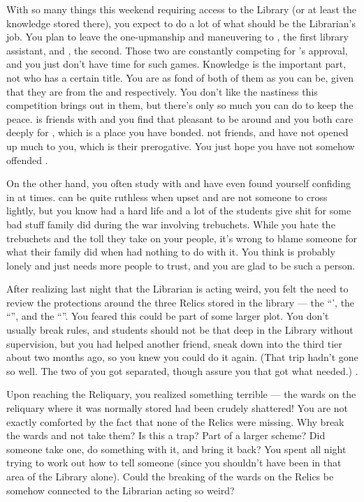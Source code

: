 \documentclass[char]{GL2020}
\begin{document}
With so many things this weekend requiring access to the Library (or at least the knowledge stored there), you expect to do a lot of what should be the Librarian’s job. You plan to leave the one-upmanship and maneuvering to \cAmbition{\full}, the first library assistant, and \cLibAssist{\full}, the second. Those two are constantly competing for \cLibrarian{}’s approval, and you just don’t have time for such games. Knowledge is the important part, not who has a certain title. You are as fond of both of them as you can be, given that they are from the \pTech{} and \pFarm{} respectively. You don't like the nastiness this competition brings out in them, but there's only so much you can do to keep the peace. \cAmbition{} is friends with \cHeir{} and you find that \cAmbition{\theyare} pleasant to be around and you both care deeply for \cHeir{}, which is a place you have bonded. \cAmbition{\Theyare} not friends, and have not opened up much to you, which is their prerogative. You just hope you have not somehow offended \cAmbition{\them}.

On the other hand, you often study with \cLibAssist{} and have even found yourself confiding in \cLibAssist{\them} at times. \cLibAssist{\They} can be quite ruthless when upset and are not someone to cross lightly, but you know \cLibAssist{\theyhave} had a hard life and a lot of the students give \cLibAssist{\them} shit for some bad stuff \cLibAssist{\their} family did during the war involving trebuchets. While you hate the trebuchets and the toll they take on your people, it's wrong to blame someone for what their family did when \cLibAssist{\they} had nothing to do with it. You think \cLibAssist{} is probably lonely and just needs more people to trust, and you are glad to be such a person. 

After realizing last night that the Librarian is acting weird, you felt the need to review the protections around the three Relics stored in the library — the ``\iNet{}', the ``\iLariat{}'', and the ``\iScythe{}''. You feared this could be part of some larger plot. You don't usually break rules, and students should not be that deep in the Library without supervision, but you had helped another friend, \cChupStudent{\full} sneak down into the third tier about two months ago, so you knew you could do it again. (That trip hadn’t gone so well. The two of you got separated, though \cChupStudent{\they} assure\cChupStudent{\verbs} you that \cChupStudent{\they} got what \cChupStudent{\they} needed.) . 

Upon reaching the Reliquary, you realized something terrible — the wards on the reliquary where it was normally stored had been crudely shattered! You are not exactly comforted by the fact that none of the Relics were missing. Why break the wards and not take them? Is this a trap? Part of a larger scheme? Did someone take one, do something with it, and bring it back? You spent all night trying to work out how to tell someone (since you shouldn't have been in that area of the Library alone). Could the breaking of the wards on the Relics be somehow connected to the Librarian acting so weird?
\end{document}
